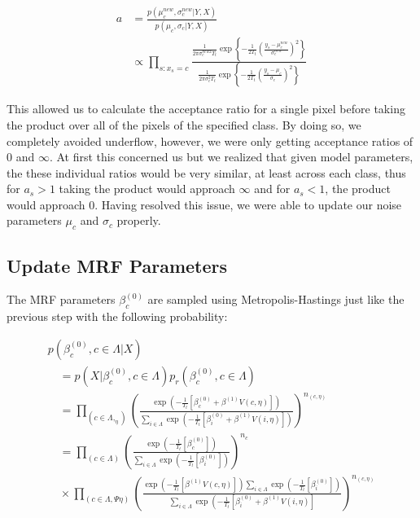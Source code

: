 \documentclass[11pt]{article}
\begin{document}
\begin{equation}
\begin{aligned}
a & = \frac{p\left(\mu_{c}^{new}, \sigma_{c}^{new} | Y, X\right)}{p\left(\mu_{c}, \sigma_{c} | Y, X\right)}\\ & \propto \prod_{s: x_{s}=c}  \frac{\frac{1}{2 \pi \sigma_{c}^{new2} T_{t}} \exp \left\{-\frac{1}{2 T_{t}} \left(\frac{y_{s}-\mu_{c}^{new}}{\sigma_{c}^{new}}\right)^{2} \right\}}{\frac{1}{2 \pi \sigma_{c}^{2} T_{t}} \exp \left\{-\frac{1}{2 T_{t}} \left(\frac{y_{s}-\mu_{c}}{\sigma_{c}}\right)^{2} \right\}}
\end{aligned}
\end{equation}

This allowed us to calculate the acceptance ratio for a single pixel before taking the product over all of the pixels of the specified class.
By doing so, we completely avoided underflow, however, we were only getting acceptance ratios of $0$ and $\infty$.
At first this concerned us but we realized that given model parameters, the these individual ratios would be very similar, at least across each class, thus for $a_{s} > 1$ taking the product would approach $\infty$ and for $a_{s} < 1$, the product would approach 0.
Having resolved this issue, we were able to update our noise parameters $\mu_{c}$ and $\sigma_{c}$ properly.

\subsection{Update MRF Parameters}
The MRF parameters $\beta_{c}^{(0)}$ are sampled using Metropolis-Hastings just like the previous step with the following probability:

\begin{equation}
\begin{array}{l}
p\left(\beta_{c}^{(0)}, c \in \Lambda | X\right) \\
\quad=p\left(X | \beta_{c}^{(0)}, c \in \Lambda\right) p_{r}\left(\beta_{c}^{(0)}, c \in \Lambda\right) \\
\quad=\prod_{\left(c \in \Lambda, _{\eta}\right)}\left(\frac{\exp \left(-\frac{1}{T_{t}}\left[\beta_{c}^{(0)}+\beta^{(1)} V(c, \eta)\right]\right)}{\sum_{i \in \Lambda} \exp \left(-\frac{1}{T_{t}}\left[\beta_{i}^{(0)}+\beta^{(1)} V(i, \eta)\right]\right)}\right)^{n_{(c, \eta)}} \\
\quad=\prod_{(c \in \Lambda)}\left(\frac{\exp \left(-\frac{1}{T_{t}}\left[\beta_{c}^{(0)}\right]\right)}{\sum_{i \in \Lambda} \exp \left(-\frac{1}{T_{t}}\left[\beta_{i}^{(0)}\right]\right)}\right)^{n_{c}} \\
\quad \times \prod_{(c \in \Lambda, \Psi \eta)}\left(\frac{\exp \left(-\frac{1}{T_{t}}\left[\beta^{(1)} V(c, \eta)\right]\right) \sum_{i \in \Lambda} \exp \left(-\frac{1}{T_{t}}\left[\beta_{i}^{(0)}\right]\right)}{\sum_{i \in \Lambda} \exp \left(-\frac{1}{T_{t}}\left[\beta_{i}^{(0)}+\beta^{(1)} V(i, \eta)\right]\right.}\right)^{n_{(c, \eta)}}
\end{array}
\end{equation}
\end{document}
